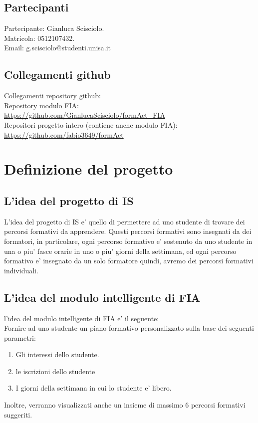 \documentclass[10pt,a4paper]{article}
\begin{document}
   
  \tableofcontents
  
   
   \subsection{Partecipanti}
   
   Partecipante: Gianluca Scisciolo.\\
   Matricola: 0512107432.\\
   Email: g.scisciolo@studenti.unisa.it
  
   \subsection{Collegamenti github}
   Collegamenti repository github:\\
   Repository modulo FIA:\\ \url{https://github.com/GianlucaScisciolo/formAct_FIA}\\
   Repositori progetto intero (contiene anche modulo FIA):\\ \url{https://github.com/fabio3649/formAct}\\
  
  \section{Definizione del progetto}
    \label{definizioneDelProgettoSection}
    
   
    \subsection{L'idea del progetto di IS}
      \label{ideaDelProgettoDiISSubsection}
      L'idea del progetto di IS e' quello di permettere ad uno studente di trovare dei 
      percorsi formativi da apprendere. Questi percorsi formativi sono insegnati da dei 
      formatori, in particolare, ogni percorso formativo e' sostenuto da uno studente in 
      una o piu' fasce orarie in uno o piu' giorni della settimana, ed ogni percorso 
      formativo e' insegnato da un solo formatore quindi, avremo dei percorsi formativi 
      individuali.%
        
   
    \subsection{L'idea del modulo intelligente di FIA}
      \label{ideaDelModuloIntelligenteDiFIASubsection}
      l'idea del modulo intelligente di FIA e' il seguente:\\
      Fornire ad uno studente un piano formativo personalizzato sulla base dei seguenti 
      parametri:\\
      \begin{enumerate}
        \item Gli interessi dello studente.
        \item le iscrizioni dello studente
        \item I giorni della settimana in cui lo studente e' libero.
      \end{enumerate}%
      Inoltre, verranno visualizzati anche un insieme di massimo 6 percorsi formativi suggeriti.
        
\end{document}
